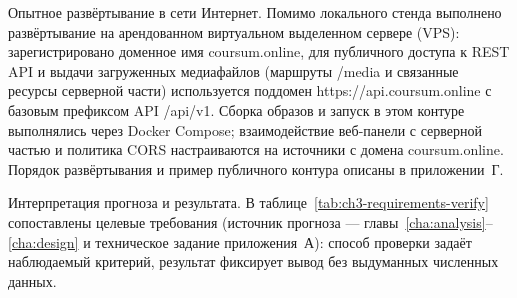 Опытное развёртывание в сети Интернет. Помимо локального стенда выполнено развёртывание на арендованном виртуальном выделенном сервере (VPS): зарегистрировано доменное имя coursum.online, для публичного доступа к REST API и выдачи загруженных медиафайлов (маршруты /media и связанные ресурсы серверной части) используется поддомен https://api.coursum.online с базовым префиксом API /api/v1. Сборка образов и запуск в этом контуре выполнялись через Docker Compose; взаимодействие веб-панели с серверной частью и политика CORS настраиваются на источники с домена coursum.online. Порядок развёртывания и пример публичного контура описаны в приложении~Г\cite{metodichka_vkr_ikt_2021,gost21052019}.

Интерпретация прогноза и результата. В таблице~\ref{tab:ch3-requirements-verify} сопоставлены целевые требования (источник прогноза --- главы~\ref{cha:analysis}--\ref{cha:design} и техническое задание приложения~А): способ проверки задаёт наблюдаемый критерий, результат фиксирует вывод без выдуманных численных данных.

